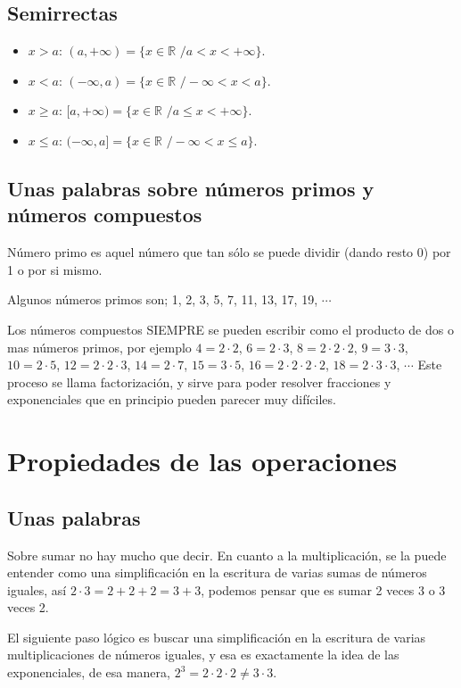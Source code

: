 \documentclass[%
 aip,
 jmp,%
 amsmath,amssymb,
 reprint,%
]{revtex4-1}
\begin{document}
\subsection{Semirrectas}
\begin{itemize}
\item $x>a$: $(a, + \infty) = \{x \in \mathbb{R}$ $ / a < x < +\infty\}$.
\item $x<a$: $(-\infty, a) = \{x \in \mathbb{R}$ $ / -\infty < x < a\}$.
\item $x \geq a$: $[a, + \infty) = \{x \in \mathbb{R}$ $ / a \leq x < +\infty\}$.
\item $x \leq a$: $(-\infty, a] = \{x \in \mathbb{R}$ $ / -\infty < x \leq a\}$.
\end{itemize}

\subsection{Unas palabras sobre números primos y números compuestos}
Número primo es aquel número que tan sólo se puede dividir (dando resto 0) por 1 o por si mismo.

Algunos números primos son; 1, 2, 3, 5, 7, 11, 13, 17, 19, $\cdots$

Los números compuestos SIEMPRE se pueden escribir como el producto de dos o mas números primos, por ejemplo $4 = 2 \cdot 2$, $6 = 2 \cdot 3$, $8 = 2 \cdot 2 \cdot 2$, $9=3 \cdot 3$, $10 = 2 \cdot 5$, $12=2\cdot 2 \cdot 3$, $14= 2 \cdot 7$, $15 = 3 \cdot 5$, $16 = 2 \cdot 2 \cdot 2 \cdot 2$, $18 = 2 \cdot 3 \cdot 3$, $\cdots$ Este proceso se llama factorización, y sirve para poder resolver fracciones y exponenciales que en principio pueden parecer muy difíciles.

\section{Propiedades de las operaciones}

\subsection{Unas palabras}

Sobre sumar no hay mucho que decir. En cuanto a la multiplicación, se la puede entender como una simplificación en la escritura de varias sumas de números iguales, así $2 \cdot 3 = 2 + 2 + 2 = 3 +3$, podemos pensar que es sumar 2 veces 3 o 3 veces 2.

El siguiente paso lógico es buscar una simplificación en la escritura de varias multiplicaciones de números iguales, y esa es exactamente la idea de las exponenciales, de esa manera, $2^3=2\cdot 2\cdot 2 \neq 3\cdot 3$.
\end{document}
